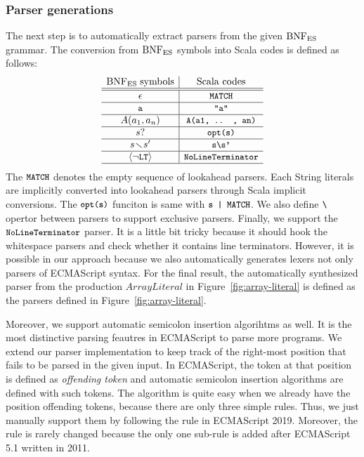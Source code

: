 \subsubsection{Parser generations}\label{sec:convert-bnfes}
The next step is to automatically extract parsers from the given \( \text{BNF}_{\text{ES}} \) grammar.
The conversion from \( \text{BNF}_{\text{ES}} \) symbols into Scala codes is defined as follows:
\[
  \begin{array}{c|c}
    \text{BNF}_{\text{ES}} \; \text{symbols} & \text{Scala codes}\\\hline\hline
    \epsilon & \texttt{\small MATCH}\\\hline
    \texttt{\small a} & \texttt{\small"a"}\\\hline
    A(a_1, a_n) & \texttt{\small A(a1, .. , an)}\\\hline
    s? & \texttt{\small opt(s)}\\\hline
    s \!\smallsetminus\! s' & \texttt{\small s\textbackslash s'}\\\hline
    \left<\neg\texttt{\small LT}\right> & \texttt{\small NoLineTerminator}\\\hline
  \end{array}
\]
The \( \texttt{\small MATCH} \) denotes the empty sequence of lookahead parsers.
Each String literals are implicitly converted into lookahead parsers
through Scala implicit conversions. The \( \texttt{\small opt(s)} \) funciton
is same with \( \texttt{\small s | MATCH} \). We also define \( \texttt{\small\textbackslash} \)
opertor between parsers to support exclusive parsers.
Finally, we support the \( \texttt{\small NoLineTerminator} \) parser.
It is a little bit tricky because it should hook the whitespace parsers
and check whether it contains line terminators.
However, it is possible in our approach because
we also automatically generates lexers not only parsers of ECMAScript syntax.
For the final result, the automatically synthesized parser from the
production \( ArrayLiteral \) in Figure~\ref{fig:array-literal} is defined
as the parsers defined in Figure~\ref{fig:array-literal}.

Moreover, we support automatic semicolon insertion algorihtms as well.
It is the most distinctive parsing feautres in ECMAScript to parse more programs.
We extend our parser implementation to keep track of the right-most position
that fails to be parsed in the given input. In ECMAScript, the token at that
position is defined as \textit{offending token} and automatic semicolon insertion
algorithms are defined with such tokens. The algorithm is quite easy when we
already have the position offending tokens, because there are only three simple
rules. Thus, we just manually support them by following the rule in ECMAScript 2019.
Moreover, the rule is rarely changed because the only one sub-rule is added
after ECMAScript 5.1 written in 2011.
